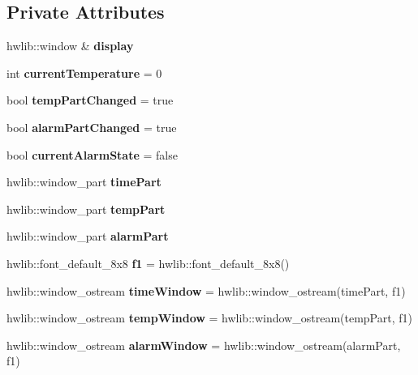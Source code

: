 \subsection*{Private Attributes}
\begin{DoxyCompactItemize}
\item 
\mbox{\label{classdisplay_manager_a53639ecfad50e9cec8a09962819b891e}} 
hwlib\+::window \& {\bfseries display}
\item 
\mbox{\label{classdisplay_manager_adf8ef128e6a7dafe6924494af28e66a7}} 
int {\bfseries current\+Temperature} = 0
\item 
\mbox{\label{classdisplay_manager_a591987c4992ab693174597b0ec6d7ea3}} 
bool {\bfseries temp\+Part\+Changed} = true
\item 
\mbox{\label{classdisplay_manager_a0a62d97a19a572162ea16ccd9608c4b2}} 
bool {\bfseries alarm\+Part\+Changed} = true
\item 
\mbox{\label{classdisplay_manager_a19bc6605b16391020185be9a714a6ba6}} 
bool {\bfseries current\+Alarm\+State} = false
\item 
hwlib\+::window\+\_\+part {\bfseries time\+Part}
\item 
hwlib\+::window\+\_\+part {\bfseries temp\+Part}
\item 
hwlib\+::window\+\_\+part {\bfseries alarm\+Part}
\item 
\mbox{\label{classdisplay_manager_a6d9538b5c815dd79746a309d3d5471a2}} 
hwlib\+::font\+\_\+default\+\_\+8x8 {\bfseries f1} = hwlib\+::font\+\_\+default\+\_\+8x8()
\item 
\mbox{\label{classdisplay_manager_a15e04593fdc2bbbcf457dc04a31c1678}} 
hwlib\+::window\+\_\+ostream {\bfseries time\+Window} = hwlib\+::window\+\_\+ostream(time\+Part, f1)
\item 
\mbox{\label{classdisplay_manager_a0a3743dd8cd6c38a82eb1d6334fe742c}} 
hwlib\+::window\+\_\+ostream {\bfseries temp\+Window} = hwlib\+::window\+\_\+ostream(temp\+Part, f1)
\item 
\mbox{\label{classdisplay_manager_af6440b079952dff0c1ad26257158c188}} 
hwlib\+::window\+\_\+ostream {\bfseries alarm\+Window} = hwlib\+::window\+\_\+ostream(alarm\+Part, f1)
\end{DoxyCompactItemize}


